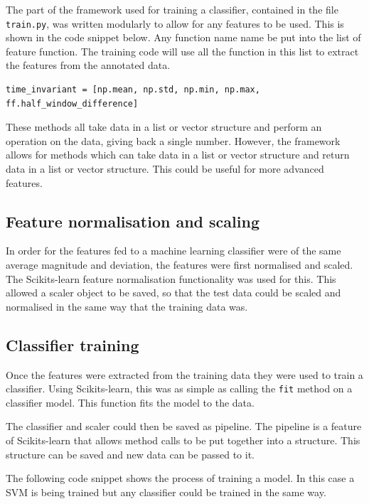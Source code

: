 The part of the framework used for training a classifier, contained in the file \texttt{train.py}, was written modularly to allow for any features to be used. This is shown in the code snippet below. Any function name name be put into the list of feature function. The training code will use all the function in this list to extract the features from the annotated data. 

\begin{verbatim}
time_invariant = [np.mean, np.std, np.min, np.max, ff.half_window_difference]
\end{verbatim}

These methods all take data in a list or vector structure and perform an operation on the data, giving back a single number. However, the framework allows for methods which can take data in a list or vector structure and return data in a list or vector structure. This could be useful for more advanced features. 

\subsection{Feature normalisation and scaling}
In order for the features fed to a machine learning classifier were of the same average magnitude and deviation, the features were first normalised and scaled. The Scikits-learn feature normalisation functionality was used for this. This allowed a scaler object to be saved, so that the test data could be scaled and normalised in the same way that the training data was. 

\subsection{Classifier training}
Once the features were extracted from the training data they were used to train a classifier. Using Scikits-learn, this was as simple as calling the \texttt{fit} method on a classifier model. This function fits the model to the data. 

The classifier and scaler could then be saved as pipeline. The pipeline is a feature of Scikits-learn that allows method calls to be put together into a structure. This structure can be saved and new data can be passed to it. 

The following code snippet shows the process of training a model. In this case a SVM is being trained but any classifier could be trained in the same way.

